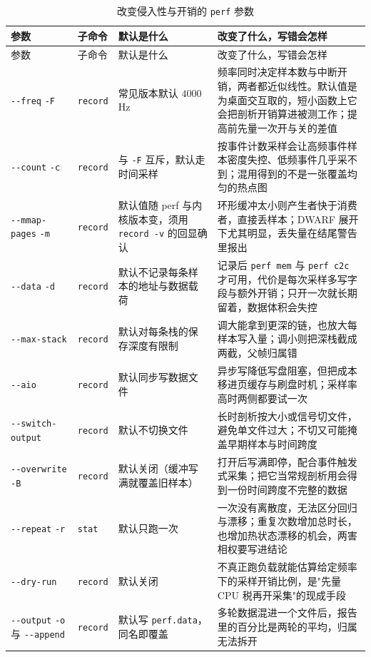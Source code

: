 \documentclass[12pt,a4paper,fontset=fandol]{ctexbook}
\newcommand{\Tp}[1]{\texttt{#1}}
\newcommand{\Opt}[1]{\texttt{-\/-#1}}
\newcommand{\Bk}{\discretionary{}{}{}}
\begin{document}
\begin{longtable}{>{\raggedright\arraybackslash}p{} >{\raggedright\arraybackslash}p{} >{\raggedright\arraybackslash}p{} >{\raggedright\arraybackslash}p{}}
\caption{改变侵入性与开销的 \Tp{perf} 参数}\label{tab:pmapB-perf-cost}\\
\toprule
参数 & 子命令 & 默认是什么 & 改变了什么，写错会怎样 \\
\midrule
\endfirsthead
\toprule
参数 & 子命令 & 默认是什么 & 改变了什么，写错会怎样 \\
\midrule
\endhead
\bottomrule
\endlastfoot
\Opt{freq} \Tp{-F} & \Tp{record} & 常见版本默认 $4000$ Hz & 频率同时决定样本数与中断开销，两者都近似线性。默认值是为桌面交互取的，短小函数上它会把剖析开销算进被测工作；提高前先量一次开与关的差值 \\
\Opt{count} \Tp{-c} & \Tp{record} & 与 \Tp{-F} 互斥，默认走时间采样 & 按事件计数采样会让高频事件样本密度失控、低频事件几乎采不到；混用得到的不是一张覆盖均匀的热点图 \\
\Opt{mmap-{\Bk}pages} \Tp{-m} & \Tp{record} & 默认值随 perf 与内核版本变，须用 \Tp{record -v} 的回显确认 & 环形缓冲太小则产生者快于消费者，直接丢样本；DWARF 展开下尤其明显，丢失量在结尾警告里报出 \\
\Opt{data} \Tp{-d} & \Tp{record} & 默认不记录每条样本的地址与数据载荷 & 记录后 \Tp{perf mem} 与 \Tp{perf c2c} 才可用，代价是每次采样多写字段与额外开销；只开一次就长期留着，数据体积会失控 \\
\Opt{max-stack} & \Tp{record} & 默认对每条栈的保存深度有限制 & 调大能拿到更深的链，也放大每样本写入量；调小则把深栈截成两截，父帧归属错 \\
\Opt{aio} & \Tp{record} & 默认同步写数据文件 & 异步写降低写盘阻塞，但把成本移进页缓存与刷盘时机；采样率高时两侧都要试一次 \\
\Opt{switch-{\Bk}output} & \Tp{record} & 默认不切换文件 & 长时剖析按大小或信号切文件，避免单文件过大；不切又可能掩盖早期样本与时间跨度 \\
\Opt{overwrite} \Tp{-B} & \Tp{record} & 默认关闭（缓冲写满就覆盖旧样本） & 打开后写满即停，配合事件触发式采集；把它当常规剖析用会得到一份时间跨度不完整的数据 \\
\Opt{repeat} \Tp{-r} & \Tp{stat} & 默认只跑一次 & 一次没有离散度，无法区分回归与漂移；重复次数增加总时长，也增加热状态漂移的机会，两害相权要写进结论 \\
\Opt{dry-run} & \Tp{record} & 默认关闭 & 不真正跑负载就能估算给定频率下的采样开销比例，是"先量 CPU 税再开采集"的现成手段 \\
\Opt{output} \Tp{-o} 与 \Opt{append} & \Tp{record} & 默认写 \Tp{perf.data}，同名即覆盖 & 多轮数据混进一个文件后，报告里的百分比是两轮的平均，归属无法拆开 \\
\end{longtable}
\end{document}
